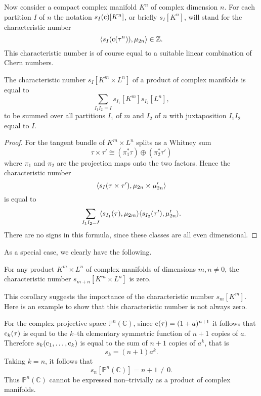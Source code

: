\documentclass[../main]{subfiles}
\begin{document}
Now consider a compact complex manifold $K^n$ of complex dimension $n$. For each partition $I$ of $n$ the notation $s_I(\operatorname{c})[K^n]$, or briefly $s_I[K^n]$, will stand for the characteristic number \[\langle s_I(\operatorname{c}(\tau^n)),\mu_{2n}\rangle \in \mathbb Z.\] This characteristic number is of course equal to a suitable linear combination of Chern numbers.

\begin{corollary}\label{cor:16.4}
The characteristic number $s_I[K^m \times L^n]$ of a product of complex manifolds is equal to \[\sum_{I_1 I_2 = I} s_{I_1}[K^m] s_{I_2} [L^n],\] to be summed over all partitions $I_1$ of $m$ and $I_2$ of $n$ with juxtaposition $I_1 I_2$ equal to $I$. 
\end{corollary}

\begin{proof}
For the tangent bundle of $K^m \times L^n$ splits as a Whitney sum \[\tau \times \tau' \cong (\pi^\ast_1 \tau) \oplus (\pi^\ast_2 \tau')\] where $\pi_1$ and $\pi_2$ are the projection maps onto the two factors. Hence the characteristic number \[\langle s_I(\tau \times \tau'),\mu_{2n} \times \mu'_{2n}\rangle\] is equal to \[\sum_{I_1 I_2 = I} \langle s_{I_1}(\tau),\mu_{2m}\rangle \langle s_{I_2}(\tau'),\mu'_{2n}\rangle.\] There are no signs in this formula, since these classes are all even dimensional.
\end{proof}

As a special case, we clearly have the following.

\begin{corollary}
For any product $K^m \times L^n$ of complex manifolds of dimensions $m, n \ne 0$, the characteristic number $s_{m + n}[K^m \times L^n]$ is zero. 
\end{corollary}

This corollary suggests the importance of the characteristic number $s_m[K^m]$. Here is an example to show that this characteristic number is not always zero. 

\begin{customexample}{16.6}\label{ex:16.6}
For the complex projective space ${\mathbb P}^n(\mathbb C)$, since $\operatorname{c}(\tau) = (1 + a)^{n + 1}$ it follows that $\operatorname{c}_k(\tau)$ is equal to the $k$--th elementary symmetric function of $n + 1$ copies of $a$. Therefore $s_k(\operatorname{c}_1, \ldots, \operatorname{c}_k)$ is equal to the sum of $n + 1$ copies of $a^k$, that is \[s_k = (n + 1)a^k.\] Taking $k = n$, it follows that \[s_n[{\mathbb P}^n(\mathbb C)] = n + 1 \ne 0.\] Thus ${\mathbb P}^n(\mathbb C)$ cannot be expressed non--trivially as a product of complex manifolds. 
\end{customexample}\setcounter{theorem}{6}
\end{document}

